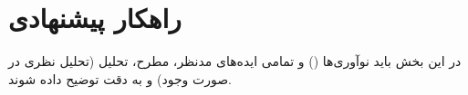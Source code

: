 \section{راهکار پیشنهادی}
\label{sec:method}
در این بخش باید نوآوری‌ها () و تمامی ایده‌های مدنظر، مطرح، تحلیل (تحلیل نظری در صورت وجود) و به دقت توضیح داده شوند.
